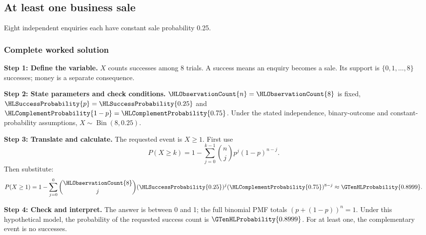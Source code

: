 \clearpage
\subsection{At least one business sale}\label{prob:sales}
Eight independent enquiries each have constant sale probability 0.25.


\subsubsection*{Complete worked solution}\label{sol:sales}
\par\noindent\begin{minipage}{\linewidth}
\textbf{Step 1: Define the variable.} $X$ counts successes among 8 trials. A success means an enquiry becomes a sale. Its support is $\{0,1,\ldots,8\}$ successes; money is a separate consequence.
\end{minipage}\par\medskip
\par\noindent\begin{minipage}{\linewidth}
\textbf{Step 2: State parameters and check conditions.} $\HLObservationCount{n}=\HLObservationCount{8}$ is fixed, $\HLSuccessProbability{p}=\HLSuccessProbability{0.25}$ and $\HLComplementProbability{1-p}=\HLComplementProbability{0.75}$. Under the stated independence, binary-outcome and constant-probability assumptions, $X\sim\operatorname{Bin}(8,0.25)$.
\end{minipage}\par\medskip
\par\noindent\begin{minipage}{\linewidth}
\textbf{Step 3: Translate and calculate.} The requested event is $ X\geq1$. First use
\[P(X\geq k)=1-\sum_{j=0}^{k-1}\binom nj p^j(1-p)^{n-j}.\]
Then substitute:
\[P(X\geq1)=1-\sum_{j=0}^{0}\binom{\HLObservationCount{8}}j(\HLSuccessProbability{0.25})^j(\HLComplementProbability{0.75})^{8-j}\approx \GTenHLProbability{0.8999}.\]
\end{minipage}\par\medskip
\par\noindent\begin{minipage}{\linewidth}
\textbf{Step 4: Check and interpret.} The answer is between 0 and 1; the full binomial PMF totals $(p+(1-p))^n=1$. Under this hypothetical model, the probability of the requested success count is $\GTenHLProbability{0.8999}$. For at least one, the complementary event is no successes.
\end{minipage}\par\medskip

